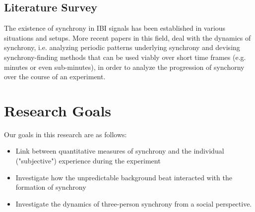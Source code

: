 \documentclass[a4paper, 11pt]{article}      %
\begin{document}
\subsection{Literature Survey}
The existence of synchrony in IBI signals has been established in various situations and setups. More recent papers in this field, deal with the dynamics of synchrony, i.e. analyzing periodic patterns underlying synchrony and devising synchrony-finding methods that can be used viably over short time frames (e.g. minutes or even sub-minutes), in order to analyze the progression of synchorny over the course of an experiment. 




\section{Research Goals}
Our goals in this research are as follows: 
\begin{itemize}
\item Link between quantitative measures of synchrony and the individual ("subjective") experience during the experiment
\item Investigate how the unpredictable background beat interacted with the formation of synchrony
\item Investigate the dynamics of three-person synchrony from a social perspective.
\end{itemize}
\end{document}
